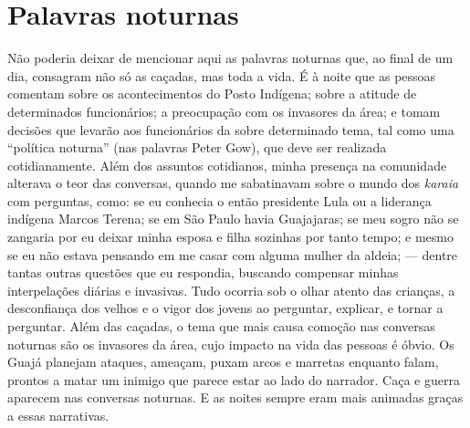 \section{Palavras noturnas }\label{palavras-noturnas}

Não poderia deixar de mencionar aqui as palavras noturnas que, ao final
de um dia, consagram não só as caçadas, mas toda a vida. É à noite que
as pessoas comentam sobre os acontecimentos do Posto Indígena; sobre a
atitude de determinados funcionários; a preocupação com os invasores da
área; e tomam decisões que levarão aos funcionários da  sobre
determinado tema, tal como uma ``política noturna'' (nas palavras Peter
Gow), que deve ser realizada cotidianamente. Além dos assuntos
cotidianos, minha presença na comunidade alterava o teor das conversas,
quando me sabatinavam sobre o mundo dos \emph{karaia} com perguntas,
como: se eu conhecia o então presidente Lula ou a liderança indígena
Marcos Terena; se em São Paulo havia Guajajaras; se meu sogro não se
zangaria por eu deixar minha esposa e filha sozinhas por tanto tempo; e
mesmo se eu não estava pensando em me casar com alguma mulher da aldeia;
--- dentre tantas outras questões que eu respondia, buscando compensar
minhas interpelações diárias e invasivas. Tudo ocorria sob o olhar
atento das crianças, a desconfiança dos velhos e o vigor dos jovens ao
perguntar, explicar, e tornar a perguntar. Além das caçadas, o tema que
mais causa comoção nas conversas noturnas são os invasores da área, cujo
impacto na vida das pessoas é óbvio. Os Guajá planejam ataques, ameaçam,
puxam arcos e marretas enquanto falam, prontos a matar um inimigo que
parece estar ao lado do narrador. Caça e guerra aparecem nas conversas
noturnas. E as noites sempre eram mais animadas graças a essas
narrativas.

